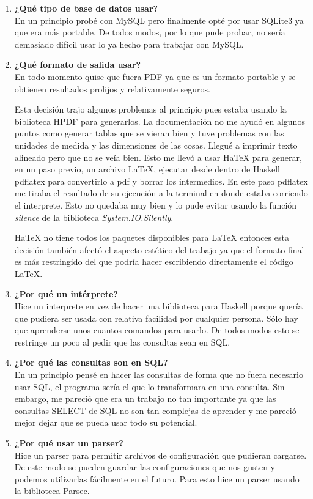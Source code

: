 \documentclass[a4paper,12pt]{article}
\begin{document}
\begin{enumerate}
\item \textbf{¿Qué tipo de base de datos usar?}\\
En un principio probé con MySQL pero finalmente opté por usar SQLite3 ya que era más portable. De todos modos, por lo que pude probar, no sería demasiado difícil usar lo ya hecho para trabajar con MySQL.
\item \textbf{¿Qué formato de salida usar?}\\
En todo momento quise que fuera PDF ya que es un formato portable y se obtienen resultados prolijos y relativamente seguros. %

Esta decisión trajo algunos problemas al principio pues estaba usando la biblioteca HPDF para generarlos. La documentación no me ayudó en algunos puntos como generar tablas que se vieran bien y tuve problemas con las unidades de medida y las dimensiones de las cosas. Llegué a imprimir texto alineado pero que no se veía bien.
Esto me llevó a usar HaTeX para generar, en un paso previo, un archivo LaTeX, ejecutar desde dentro de Haskell pdflatex para convertirlo a pdf y borrar los intermedios.
En este paso pdflatex me tiraba el resultado de su ejecución a la terminal en donde estaba corriendo el interprete. Esto no quedaba muy bien y lo pude evitar usando la función \textit{silence} de la biblioteca \textit{System.IO.Silently}.

HaTeX no tiene todos los paquetes disponibles para LaTeX entonces esta decisión también afectó el aspecto estético del trabajo ya que el formato final es más restringido del que podría hacer escribiendo directamente el código LaTeX.

\item \textbf{¿Por qué un intérprete?}\\
Hice un interprete en vez de hacer una biblioteca para Haskell porque quería que pudiera ser usada con relativa facilidad por cualquier persona. Sólo hay que aprenderse unos cuantos comandos para usarlo. De todos modos esto se restringe un poco al pedir que las consultas sean en SQL.

\item \textbf{¿Por qué las consultas son en SQL?}\\
En un principio pensé en hacer las consultas de forma que no fuera necesario usar SQL, el programa sería el que lo transformara en una consulta. Sin embargo, me pareció que era un trabajo no tan importante ya que las consultas SELECT de SQL no son tan complejas de aprender y me pareció mejor dejar que se pueda usar todo su potencial.

\item \textbf{¿Por qué usar un parser?}\\
Hice un parser para permitir archivos de configuración que pudieran cargarse. De este modo se pueden guardar las configuraciones que nos gusten y podemos utilizarlas fácilmente en el futuro. Para esto hice un parser usando la biblioteca Parsec.
\end{enumerate}
\end{document}
